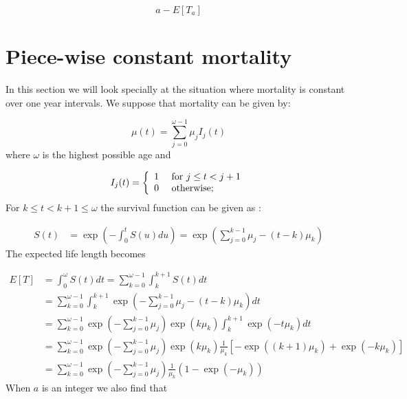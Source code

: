 \begin{equation}
 a - E[T_{a}]   
\end{equation}


\section{Piece-wise constant mortality}

In this section we will look specially at the situation where mortality is constant over one year intervals.
We suppose that mortality can be given by:

\begin{equation}
\mu(t) = \sum\limits_{j=0}^{\omega-1} \mu_{j} I_{j}(t)
\label{constant mortality}
\end{equation}
where $\omega$ is the highest possible age and


\begin{equation*}
   I_{j}(t)= 
\left\{\begin{array}{rl}
 1 & \mbox{ for $ j \leq t < j + 1 $} \\
 0 & \mbox{ otherwise}; 
       \end{array} \right. 
\end{equation*}
For $ k \leq t < k + 1 \leq \omega $ the survival function can be given as :

\begin{align}
     S(t) &= \exp({-\int_{0}^t S(u)du})
          = \exp{(\sum\limits_{j=0}^{k-1} \mu_{j}- (t - k)\mu_{k})}
\end{align}
The expected life length becomes


\begin{align*}
    E[T] &= \int_{0}^\omega S(t)dt = \sum\limits_{k=0}^{\omega-1} \int_{k}^{k+1} S(t) dt \\
         &= \sum\limits_{k=0}^{\omega-1} \int_{k}^{k+1}\exp{(-\sum\limits_{j=0}^{k-1}\mu_{j}-(t-k)\mu_{k})} dt\\ 
         &= \sum\limits_{k=0}^{\omega-1}  \exp{(-\sum\limits_{j=0}^{k-1}\mu_{j})}  \exp({k\mu_{k}}) \int_{k}^{k+1}\exp{(-t\mu_{k})} dt \\
         &= \sum\limits_{k=0}^{\omega-1}  \exp{(-\sum\limits_{j=0}^{k-1}\mu_{j})} 
         \exp{(k\mu_{k})} \frac{1}{\mu_{k}}[-\exp{((k+1)\mu_{k})} + \exp{(-k\mu_{k})}] \\      
         &= \sum\limits_{k=0}^{\omega-1}  \exp{(-\sum\limits_{j=0}^{k-1}\mu_{j})}  \frac{1}{\mu_{k}}(1 - \exp{(-\mu_{k})})
\end{align*}
When $a$ is an integer we also find that
 
